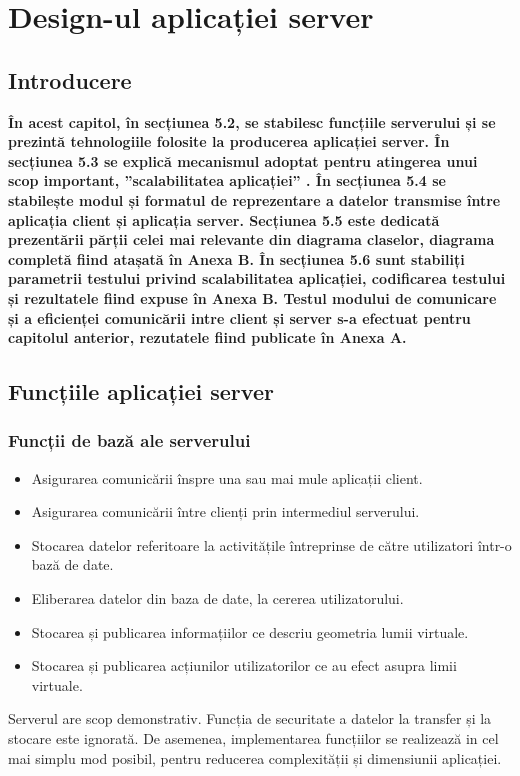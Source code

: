 \chapter{Design-ul aplicației server}
\section{Introducere}
\par \textbf{În acest capitol, în secțiunea 5.2, se stabilesc funcțiile serverului și se prezintă tehnologiile folosite la producerea aplicației server. În secțiunea 5.3 se explică mecanismul adoptat pentru atingerea unui scop important, ”scalabilitatea aplicației” . În secțiunea 5.4 se stabilește modul și formatul de reprezentare a datelor transmise între aplicația client și aplicația server. Secțiunea 5.5 este dedicată prezentării părții celei mai relevante din diagrama claselor, diagrama completă fiind atașată în Anexa B. În secțiunea 5.6 sunt stabiliți parametrii testului privind scalabilitatea aplicației, codificarea testului și rezultatele fiind expuse în Anexa B. Testul modului de comunicare și a eficienței comunicării intre client și server s-a efectuat pentru capitolul anterior, rezutatele fiind publicate în Anexa A. } 

\section{Funcțiile aplicației server}
\subsection{Funcții de bază ale serverului} 
\begin{itemize}
\item Asigurarea comunicării înspre una sau mai mule aplicații client.
\item Asigurarea comunicării între clienți prin intermediul serverului.
\item Stocarea datelor referitoare la activitățile întreprinse de către utilizatori într-o bază de date.
\item Eliberarea datelor din baza de date, la cererea utilizatorului.
\item Stocarea și publicarea informațiilor ce descriu geometria lumii virtuale.
\item Stocarea și publicarea acțiunilor utilizatorilor ce au efect asupra limii virtuale.
\end{itemize}

\par Serverul are scop demonstrativ. Funcția de securitate a datelor la transfer și la stocare este ignorată. De asemenea, implementarea funcțiilor se realizează in cel mai simplu mod posibil, pentru reducerea complexității și dimensiunii aplicației.


